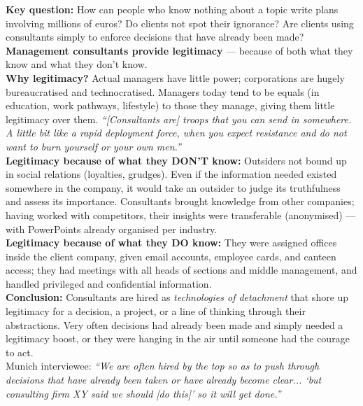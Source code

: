 \documentclass[a4paper,12pt]{article}
\begin{document}
\noindent \textbf{Key question:} How can people who know nothing about a topic write plans involving millions of euros? Do clients not spot their ignorance? Are clients using consultants simply to enforce decisions that have already been made? \\

\noindent \textbf{Management consultants provide legitimacy} — because of both what they know and what they don't know. \\

\noindent \textbf{Why legitimacy?} Actual managers have little power; corporations are hugely bureaucratised and technocratised. Managers today tend to be equals (in education, work pathways, lifestyle) to those they manage, giving them little legitimacy over them. \emph{``[Consultants are] troops that you can send in somewhere. A little bit like a rapid deployment force, when you expect resistance and do not want to burn yourself or your own men.''} \\

\noindent \textbf{Legitimacy because of what they DON'T know:} Outsiders not bound up in social relations (loyalties, grudges). Even if the information needed existed somewhere in the company, it would take an outsider to judge its truthfulness and assess its importance. Consultants brought knowledge from other companies; having worked with competitors, their insights were transferable (anonymised) — with PowerPoints already organised per industry. \\

\noindent \textbf{Legitimacy because of what they DO know:} They were assigned offices inside the client company, given email accounts, employee cards, and canteen access; they had meetings with all heads of sections and middle management, and handled privileged and confidential information. \\

\noindent \textbf{Conclusion:} Consultants are hired as \emph{technologies of detachment} that shore up legitimacy for a decision, a project, or a line of thinking through their abstractions. Very often decisions had already been made and simply needed a legitimacy boost, or they were hanging in the air until someone had the courage to act. \\

\noindent Munich interviewee: \emph{``We are often hired by the top so as to push through decisions that have already been taken or have already become clear... `but consulting firm XY said we should [do this]' so it will get done.''} \\
\end{document}
